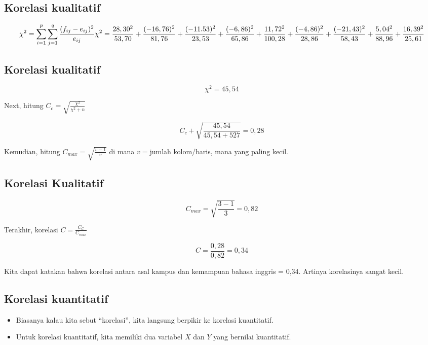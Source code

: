 \documentclass[
  letterpaper,
  DIV=11,
  numbers=noendperiod]{scrartcl}
\begin{document}
\subsection{Korelasi kualitatif}\label{korelasi-kualitatif-3}

\[
\chi^2=\sum_{i=1}^{p} \sum_{j=1}^{q} \frac{(f_{ij}-e_{ij})^2}{e_{ij}} \\ \chi^2=\frac{28,30^2}{53,70}+\frac{(-16,76)^2}{81,76}+\frac{(-11.53)^2}{23,53} \\ +\frac{(-6,86)^2}{65,86}+\frac{11,72^2}{100,28}+\frac{(-4,86)^2}{28,86} \\ +\frac{(-21,43)^2}{58,43}+\frac{5,04^2}{88,96}+\frac{16,39^2}{25,61}
\]

\subsection{Korelasi kualitatif}\label{korelasi-kualitatif-4}

\[
\chi^2=45,54
\]

Next, hitung \(C_c=\sqrt{\frac{\chi^2}{\chi^2+n}}\)

\[
C_c+\sqrt{\frac{45,54}{45,54+527}}=0,28
\]

Kemudian, hitung \(C_{max}=\sqrt{\frac{v-1}{v}}\) di mana \(v=\)jumlah
kolom/baris, mana yang paling kecil.

\subsection{Korelasi Kualitatif}\label{korelasi-kualitatif-5}

\[
C_{max}=\sqrt{\frac{3-1}{3}}=0,82
\]

Terakhir, korelasi \(C=\frac{C_C}{C_{max}}\)

\[
C=\frac{0,28}{0,82}=0,34
\]

Kita dapat katakan bahwa korelasi antara asal kampus dan kemampuan
bahasa inggris = 0,34. Artinya korelasinya sangat kecil.

\subsection{Korelasi kuantitatif}\label{korelasi-kuantitatif}

\begin{itemize}
\item
  Biasanya kalau kita sebut ``korelasi'', kita langsung berpikir ke
  korelasi kuantitatif.
\item
  Untuk korelasi kuantitatif, kita memiliki dua variabel \(X\) dan \(Y\)
  yang bernilai kuantitatif.
\end{itemize}
\end{document}
